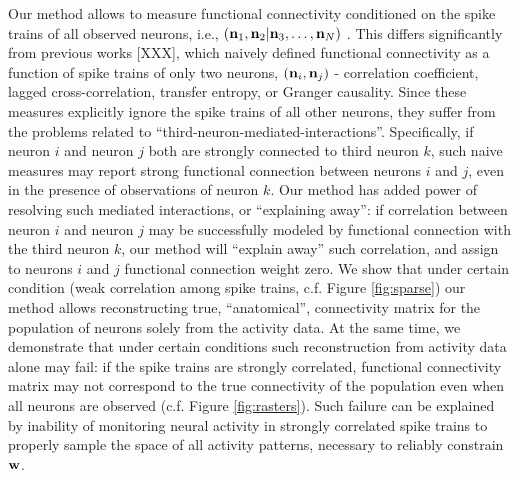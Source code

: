 Our method allows to measure functional connectivity conditioned on the spike trains of all observed neurons, i.e., $({\bf n}_1,{\bf n}_2 | {\bf n}_3, \ldots, {\bf n}_N)$ \cite{emory, liam, Garofalo, Vakorina, etc.}. This differs significantly from previous works [XXX], which naively defined functional connectivity as a function of spike trains of only two neurons, $({\bf n}_i,{\bf n}_j)$  - correlation coefficient, lagged cross-correlation, transfer entropy, or Granger causality. Since these measures explicitly ignore the spike trains of all other neurons, they suffer from the problems related to  ``third-neuron-mediated-interactions''. Specifically, if neuron $i$ and neuron $j$ both are strongly connected to third neuron $k$, such naive measures may report strong functional connection between neurons $i$ and $j$, even in the presence of observations of neuron $k$. Our method has added power of resolving such mediated interactions, or ``explaining away'': if correlation between neuron $i$ and neuron $j$ may be successfully modeled by functional connection with the third neuron $k$, our method will ``explain away'' such correlation, and assign to neurons $i$ and $j$ functional connection weight zero. 
We show that under certain condition (weak correlation among spike trains, c.f. Figure \ref{fig:sparse}) our method allows reconstructing true, ``anatomical'', connectivity matrix for the population of neurons solely from the activity data. At the same time, we demonstrate that under certain conditions such reconstruction from activity data alone may fail: if the spike trains are strongly correlated, functional connectivity matrix may not correspond to the true connectivity of the population even when all neurons are observed (c.f. Figure \ref{fig:rasters}). Such failure can be explained by inability of monitoring neural activity in strongly correlated spike trains to properly sample the space of all activity patterns, necessary to reliably constrain $\mathbf{w}$.


